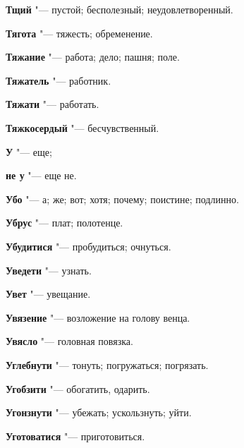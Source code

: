 \begin{mymulticols}{2}
\noindent\textbf{Тщий} "--- пустой; бесполезный; неудовлетворенный. 




\noindent\textbf{Тягота} "--- тяжесть; обременение. 




\noindent\textbf{Тяжание} "--- работа; дело; пашня; поле. 




\noindent\textbf{Тяжатель} "--- работник. 




\noindent\textbf{Тяжати} "--- работать. 




\noindent\textbf{Тяжкосердый} "--- бесчувственный. 









\noindent\textbf{У} "--- еще; 




\noindent\textbf{не у} "--- еще не. 




\noindent\textbf{Убо} "--- а; же; вот; хотя; почему; поистине; подлинно. 




\noindent\textbf{Убрус} "--- плат; полотенце. 




\noindent\textbf{Убудитися} "--- пробудиться; очнуться. 




\noindent\textbf{Уведети} "--- узнать. 




\noindent\textbf{Увет} "--- увещание. 




\noindent\textbf{Увязение} "--- возложение на голову венца. 




\noindent\textbf{Увясло} "--- головная повязка. 




\noindent\textbf{Углебнути} "--- тонуть; погружаться; погрязать. 




\noindent\textbf{Угобзити} "--- обогатить, одарить. 




\noindent\textbf{Угонзнути} "--- убежать; ускользнуть; уйти. 




\noindent\textbf{Уготоватися} "--- приготовиться. 





\end{mymulticols}
